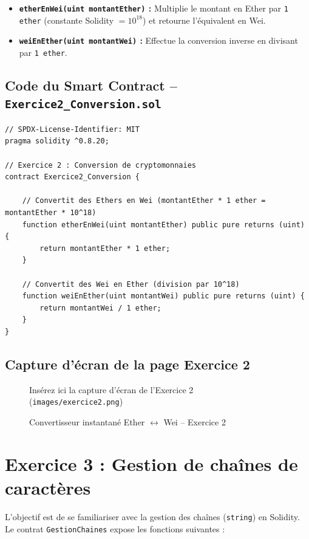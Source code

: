 \documentclass[12pt,a4paper]{report}
\begin{document}
\begin{itemize}
    \item \textbf{\texttt{etherEnWei(uint montantEther)} :} Multiplie le montant en Ether par
          \texttt{1 ether} (constante Solidity $= 10^{18}$) et retourne l'équivalent en Wei.
    \item \textbf{\texttt{weiEnEther(uint montantWei)} :} Effectue la conversion inverse en divisant
          par \texttt{1 ether}.
\end{itemize}

\subsection{Code du Smart Contract -- \texttt{Exercice2\_Conversion.sol}}
\begin{lstlisting}[language=Solidity, caption={Contrat Conversion.sol -- Ether et Wei}]
// SPDX-License-Identifier: MIT
pragma solidity ^0.8.20;

// Exercice 2 : Conversion de cryptomonnaies
contract Exercice2_Conversion {

    // Convertit des Ethers en Wei (montantEther * 1 ether = montantEther * 10^18)
    function etherEnWei(uint montantEther) public pure returns (uint) {
        return montantEther * 1 ether;
    }

    // Convertit des Wei en Ether (division par 10^18)
    function weiEnEther(uint montantWei) public pure returns (uint) {
        return montantWei / 1 ether;
    }
}
\end{lstlisting}

\subsection{Capture d'écran de la page Exercice 2}
\begin{figure}[h!]
    \centering
    \begin{tcolorbox}[colback=red!5,colframe=red!50!black,title=Capture d'écran manquante]
        Insérez ici la capture d'écran de l'Exercice 2 (\texttt{images/exercice2.png})
    \end{tcolorbox}
    \caption{Convertisseur instantané Ether $\leftrightarrow$ Wei -- Exercice 2}
\end{figure}

\newpage

\section{Exercice 3 : Gestion de chaînes de caractères}
L'objectif est de se familiariser avec la gestion des chaînes (\texttt{string}) en Solidity.
Le contrat \texttt{GestionChaines} expose les fonctions suivantes :
\end{document}
